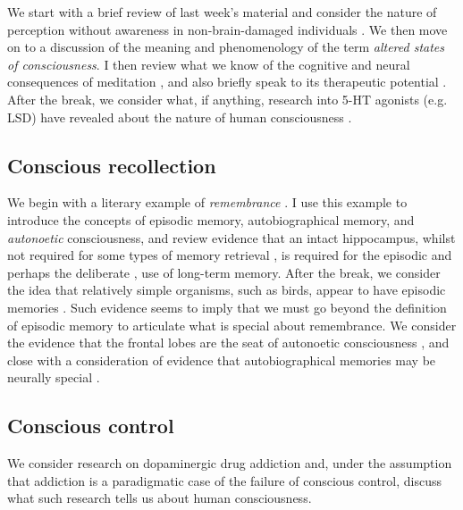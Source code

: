 \documentclass[11pt]{article}
\begin{document}
We start with a brief review of last week's material and consider the
nature of perception without awareness in non-brain-damaged
individuals \cite{debner94, mccormick97, moore97, marcel83}. We then
move on to a discussion of the meaning and phenomenology of the term
\emph{altered states of consciousness}.  I then review what we know of
the cognitive and neural consequences of meditation \cite{jha07,
  lutz08, lutz04}, and also briefly speak to its therapeutic potential
\cite{miller95, ramel04, tang07}. After the break, we consider what,
if anything, research into 5-HT agonists (e.g. LSD) have revealed
about the nature of human consciousness \cite{nichols04}.

\subsection*{Conscious recollection}

We begin with a literary example of \emph{remembrance}
\cite{proust}. I use this example to introduce the concepts of
episodic memory, autobiographical memory, and \emph{autonoetic}
consciousness, and review evidence that an intact hippocampus, whilst
not required for some types of memory retrieval \cite{cermak85}, is
required for the episodic \cite{rempel96} and perhaps the deliberate
\cite{badd94}, use of long-term memory. After the break, we consider
the idea that relatively simple organisms, such as birds, appear to
have episodic memories \cite{clay98}. Such evidence seems to imply
that we must go beyond the definition of episodic memory to articulate
what is special about remembrance. We consider the evidence that the
frontal lobes are the seat of autonoetic consciousness
\cite{wheeler97}, and close with a consideration of evidence that
autobiographical memories may be neurally special \cite{fink99}.

\subsection*{Conscious control}

We consider research on dopaminergic drug addiction \cite{robinson03}
and, under the assumption that addiction is a paradigmatic case of the
failure of conscious control, discuss what such research tells us
about human consciousness.


 {}
\end{document}
